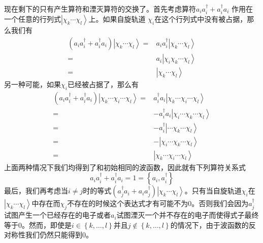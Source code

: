 \documentclass[12pt,a4paper,openany,twoside]{book}
\numberwithin{equation}{section}
\begin{document}
          现在剩下的只有产生算符和湮灭算符的交换了。首先考虑算符$a_i a_i^\dagger+a_i^\dagger a_i$
          作用在一个任意的行列式$\left|\chi_k\cdots\chi_l\right\rangle$上。如果自旋轨道
          $\chi_i$在这个行列式中没有被占据，那么我们有
          \begin{equation}
            \begin{aligned}
              \left(a_i a_i^\dagger+a_i^\dagger a_i\right)\left|\chi_k\cdots\chi_l\right\rangle=&a_i a_i^\dagger\left|\chi_k\cdots\chi_l\right\rangle\\
              =&a_i\left|\chi_i\chi_k\cdots\chi_l\right\rangle\\
              =&\left|\chi_k\cdots\chi_l\right\rangle
            \end{aligned}
          \end{equation}
          另一种可能，如果$\chi_i$已经被占据了，那么有
          \begin{equation}
            \begin{aligned}
              \left(a_i a_i^\dagger+a_i^\dagger a_i\right)\left|\chi_k\cdots\chi_i\cdots\chi_l\right\rangle=&a_i^\dagger a_i\left|\chi_k\cdots\chi_i\cdots\chi_l\right\rangle\\
              =&-a_i^\dagger a_i\left|\chi_i\cdots\chi_k\cdots\chi_l\right\rangle\\
              =&-a_i^\dagger\left|\cdots\chi_k\cdots\chi_l\right\rangle\\
              =&-\left|\chi_i\cdots\chi_k\cdots\chi_l\right\rangle\\
              =&\left|\chi_k\cdots\chi_i\cdots\chi_l\right\rangle
            \end{aligned}
          \end{equation}
          上面两种情况下我们均得到了和初始相同的波函数，因此就有下列算符关系式
          \begin{equation}
            a_i a_i^\dagger+a_i^\dagger a_i=1=\left\{a_i,a_i^\dagger\right\}
            \label{anti commutator ai ai^dagger}
          \end{equation}
          最后，我们再考虑当$i\neq j$时的等式$\left(a_j^\dagger a_i+a_i a_j^\dagger\right)\left|\chi_k\cdots \chi_l\right\rangle$。只有当自旋轨道$\chi_i$在$\left|\chi_k\cdots\chi_l\right\rangle$中存在而$\chi_j$不存在的时候这个表达式才有可能不为0。否则我们会因为$a_j^\dagger$试图产生一个已经存在的电子或者$a_i$试图湮灭一个并不存在的电子而使得式子最终等于0。然而，即使是$i\in\left\{k,\ldots,l\right\}$并且$j\notin\left\{k,\ldots,l\right\}$的情况下，由于波函数的反对称性我们仍然只能得到0。
\end{document}
